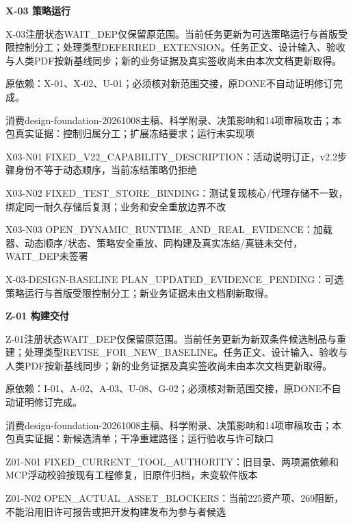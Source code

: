 \documentclass[11pt,a4paper]{article}
\newcommand{\reviewsection}[1]{\par\Needspace{5\baselineskip}\vspace{10pt}\begin{center}{\titlelatin\titlecjk\bfseries\fontsize{14}{20}\selectfont #1}\end{center}}
\begin{document}
\reviewsection{X-\allowbreak{}03 策略运行}
X-\allowbreak{}03注册状态WAIT\_\allowbreak{}DEP仅保留原范围。当前任务更新为可选策略运行与首版受限控制分工；处理类型DEFERRED\_\allowbreak{}EXTENSION。任务正文、设计输入、验收与人类PDF按新基线同步；新的业务证据及真实签收尚未由本次文档更新取得。


原依赖：X-\allowbreak{}01、X-\allowbreak{}02、U-\allowbreak{}01；必须核对新范围交接，原DONE不自动证明修订完成。


消费design-\allowbreak{}foundation-\allowbreak{}20261008主稿、科学附录、决策影响和14项审稿攻击；本包真实证据：控制归属分工；扩展冻结要求；运行未实现项


X03-\allowbreak{}N01 FIXED\_\allowbreak{}V22\_\allowbreak{}CAPABILITY\_\allowbreak{}DESCRIPTION：活动说明订正，v2.2步骤身份不等于动态顺序，当前冻结策略仍拒绝


X03-\allowbreak{}N02 FIXED\_\allowbreak{}TEST\_\allowbreak{}STORE\_\allowbreak{}BINDING：测试复现核心/\allowbreak{}代理存储不一致，绑定同一耐久存储后复测；业务和安全重放边界不改


X03-\allowbreak{}N03 OPEN\_\allowbreak{}DYNAMIC\_\allowbreak{}RUNTIME\_\allowbreak{}AND\_\allowbreak{}REAL\_\allowbreak{}EVIDENCE：加载器、动态顺序/\allowbreak{}状态、策略安全重放、同构建及真实冻结/\allowbreak{}真链未交付，WAIT\_\allowbreak{}DEP未签署


X-\allowbreak{}03-\allowbreak{}DESIGN-\allowbreak{}BASELINE PLAN\_\allowbreak{}UPDATED\_\allowbreak{}EVIDENCE\_\allowbreak{}PENDING：可选策略运行与首版受限控制分工；新业务证据未由文档刷新取得。


\reviewsection{Z-\allowbreak{}01 构建交付}
Z-\allowbreak{}01注册状态WAIT\_\allowbreak{}DEP仅保留原范围。当前任务更新为新双条件候选制品与重建；处理类型REVISE\_\allowbreak{}FOR\_\allowbreak{}NEW\_\allowbreak{}BASELINE。任务正文、设计输入、验收与人类PDF按新基线同步；新的业务证据及真实签收尚未由本次文档更新取得。


原依赖：I-\allowbreak{}01、A-\allowbreak{}02、A-\allowbreak{}03、U-\allowbreak{}08、G-\allowbreak{}02；必须核对新范围交接，原DONE不自动证明修订完成。


消费design-\allowbreak{}foundation-\allowbreak{}20261008主稿、科学附录、决策影响和14项审稿攻击；本包真实证据：新候选清单；干净重建路径；运行验收与许可缺口


Z01-\allowbreak{}N01 FIXED\_\allowbreak{}CURRENT\_\allowbreak{}TOOL\_\allowbreak{}AUTHORITY：旧目录、两项漏依赖和MCP浮动校验按现有工程修复，旧原件归档，未变软件版本


Z01-\allowbreak{}N02 OPEN\_\allowbreak{}ACTUAL\_\allowbreak{}ASSET\_\allowbreak{}BLOCKERS：当前225资产项、269阻断，不能沿用旧许可报告或把开发构建发布为参与者候选
\end{document}
